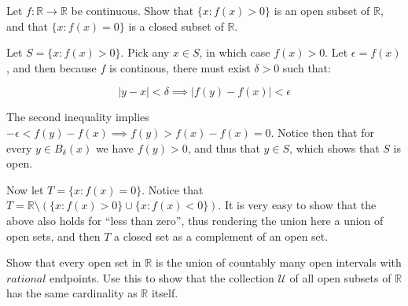\begin{exercise}{5}
    Let $f: \mathbb{R} \rightarrow \mathbb{R}$ be continuous.
    Show that $\{x: f(x) > 0\}$ is an open subset of $\mathbb{R}$, and that $\{x: f(x) = 0\}$ is a closed subset of $\mathbb{R}$.
\end{exercise}

\begin{solution}
    
    Let $S = \{x: f(x) > 0\}$.
    Pick any $x \in S$, in which case $f(x) > 0$.
    Let $\epsilon = f(x)$, and then because $f$ is continous, there must exist $\delta > 0$ such that:

    $$\lvert y - x \rvert < \delta \implies \lvert f(y) - f(x) \rvert < \epsilon$$

    The second inequality implies $-\epsilon < f(y) - f(x) \implies f(y) > f(x) - f(x) = 0$.
    Notice then that for every $y \in B_{\delta}(x)$ we have $f(y) > 0$, and thus that $y \in S$, which shows that $S$ is open.

    Now let $T = \{x: f(x) = 0\}$.
    Notice that $T = \mathbb{R} \setminus (\{x: f(x) > 0\} \cup \{x: f(x) < 0\})$.
    It is very easy to show that the above also holds for ``less than zero'', thus rendering the union here a union of open sets, and then $T$ a closed set as a complement of an open set.

\end{solution}

\begin{exercise}{7}
    Show that every open set in $\mathbb{R}$ is the union of countably many open intervals with $\textit{rational}$ endpoints.
    Use this to show that the collection $\mathcal{U}$ of all open subsets of $\mathbb{R}$ has the same cardinality as $\mathbb{R}$ itself.
\end{exercise}


